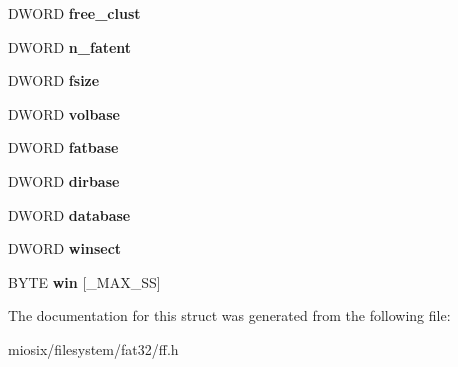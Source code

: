 \begin{DoxyCompactItemize}
\item 
\hypertarget{struct_f_a_t_f_s_a5fb49e6ac511bd97eaffdd636d0e4165}{D\-W\-O\-R\-D {\bfseries free\-\_\-clust}}\label{struct_f_a_t_f_s_a5fb49e6ac511bd97eaffdd636d0e4165}

\item 
\hypertarget{struct_f_a_t_f_s_a8da50eeba6469bc20d60ca0cf9a1307c}{D\-W\-O\-R\-D {\bfseries n\-\_\-fatent}}\label{struct_f_a_t_f_s_a8da50eeba6469bc20d60ca0cf9a1307c}

\item 
\hypertarget{struct_f_a_t_f_s_a53e9560659f14e66f306c2c444198bf3}{D\-W\-O\-R\-D {\bfseries fsize}}\label{struct_f_a_t_f_s_a53e9560659f14e66f306c2c444198bf3}

\item 
\hypertarget{struct_f_a_t_f_s_a8f0ca578755749d204f59dc83f1a7649}{D\-W\-O\-R\-D {\bfseries volbase}}\label{struct_f_a_t_f_s_a8f0ca578755749d204f59dc83f1a7649}

\item 
\hypertarget{struct_f_a_t_f_s_a848fba02c4aabe02ef2984e578f33d64}{D\-W\-O\-R\-D {\bfseries fatbase}}\label{struct_f_a_t_f_s_a848fba02c4aabe02ef2984e578f33d64}

\item 
\hypertarget{struct_f_a_t_f_s_a3f72fd998dbcce4652a85a81fe944bc4}{D\-W\-O\-R\-D {\bfseries dirbase}}\label{struct_f_a_t_f_s_a3f72fd998dbcce4652a85a81fe944bc4}

\item 
\hypertarget{struct_f_a_t_f_s_a5b6c0bc2e9fd2ae8ef714210a74a2d5d}{D\-W\-O\-R\-D {\bfseries database}}\label{struct_f_a_t_f_s_a5b6c0bc2e9fd2ae8ef714210a74a2d5d}

\item 
\hypertarget{struct_f_a_t_f_s_ac60e69c00e6bf7c25febfbac4dc1476b}{D\-W\-O\-R\-D {\bfseries winsect}}\label{struct_f_a_t_f_s_ac60e69c00e6bf7c25febfbac4dc1476b}

\item 
\hypertarget{struct_f_a_t_f_s_a7cc35a593465e727ab87723c14610644}{B\-Y\-T\-E {\bfseries win} \mbox{[}\-\_\-\-M\-A\-X\-\_\-\-S\-S\mbox{]}}\label{struct_f_a_t_f_s_a7cc35a593465e727ab87723c14610644}

\end{DoxyCompactItemize}


The documentation for this struct was generated from the following file\-:\begin{DoxyCompactItemize}
\item 
miosix/filesystem/fat32/ff.\-h\end{DoxyCompactItemize}
